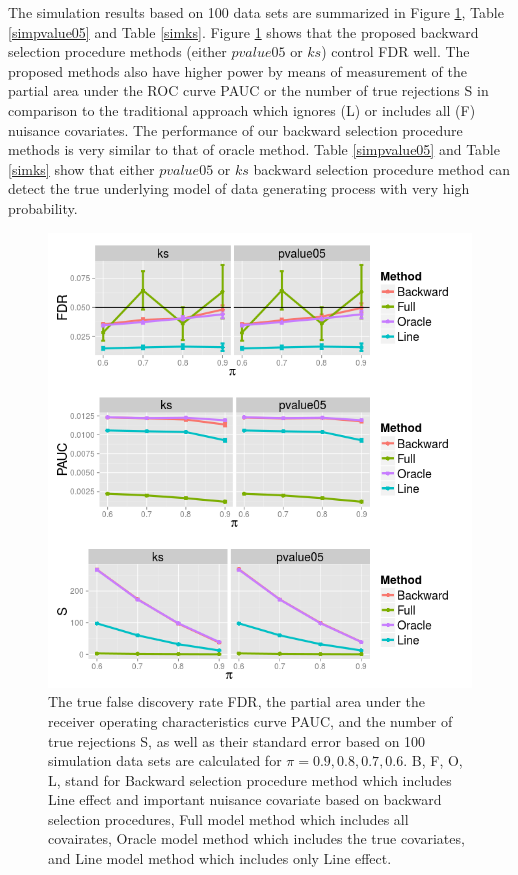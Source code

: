 \documentclass[12pt, letter]{article}\usepackage[]{graphicx}\usepackage[]{color}
\begin{document}
The simulation results based on 100 data sets are summarized in Figure \ref{simfigure},  Table \ref{simpvalue05} and Table \ref{simks}. Figure \ref{simfigure} shows that the proposed backward selection procedure methods (either $pvalue05$ or $ks$)  control FDR well. The proposed methods also have higher power  by means of  measurement of the partial area under the ROC curve PAUC or the number of true rejections S in comparison to the traditional approach  which  ignores (L) or includes all  (F) nuisance covariates. The performance of our backward selection procedure methods is very similar to that of oracle method. Table \ref{simpvalue05} and Table \ref{simks} show that either $pvalue05$ or $ks$ backward selection procedure method can detect the true underlying model of data generating process with very high probability. 

\begin{figure}
\centering
\includegraphics[scale = 0.8]{result.png}
\caption{The true false discovery rate FDR, the partial area under the receiver operating characteristics curve PAUC, and the number of true rejections S, as well as their standard error based on  100 simulation data sets are calculated for  $\pi = 0.9, 0.8, 0.7, 0.6$. B, F, O, L, stand for Backward selection procedure method which includes Line effect and important nuisance covariate based on backward selection procedures, Full model method which includes all covairates, Oracle model method which includes the true covariates, and Line model method which includes only Line effect.}
\label{simfigure}
\end{figure}
\end{document}
